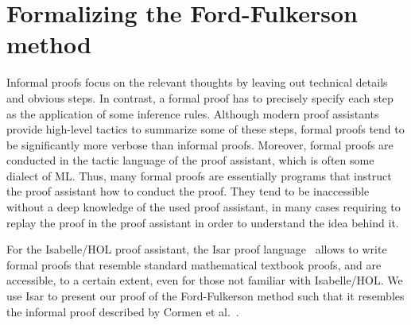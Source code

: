 \documentclass{llncs}
\newcommand{\isai}{\lstinline[language=isabelle,basicstyle=\normalsize\ttfamily\slshape]}
\begin{document}
\section{Formalizing the Ford-Fulkerson method}\label{sec:abs-formalization}
%
%    
%      
%    
%    


Informal proofs focus on the relevant thoughts by leaving out technical details and obvious steps. 
In contrast, a formal proof has to precisely specify each step as the application of some inference rules. 
Although modern proof assistants provide high-level tactics to summarize some of these steps, formal proofs tend to be significantly more 
verbose than informal proofs. Moreover, formal proofs are conducted in the tactic language of the proof assistant, which is often some dialect of ML. 
Thus, many formal proofs are essentially programs that instruct the proof assistant how to conduct the proof. They tend to be inaccessible without a deep knowledge of the used proof assistant, in many cases requiring to replay the proof in the proof assistant in order to understand the idea behind it.

For the Isabelle/HOL proof assistant, the Isar proof language~\cite{Wenzel99} allows to write formal proofs that resemble standard mathematical textbook proofs, and are accessible, to a certain extent, even for those not familiar with Isabelle/HOL. 
We use Isar to present our proof of the Ford-Fulkerson method such that it resembles the informal proof described by Cormen et al.~\cite{CLRS09}.
\end{document}

